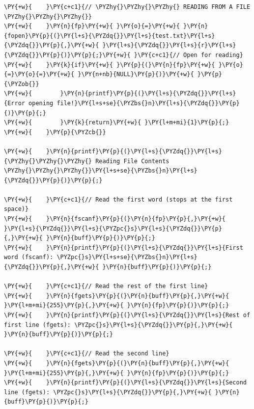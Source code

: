 \begin{Verbatim}[label=\makebox{\url{https://github.com/lucabaldini/cmepda/tree/master/slides/latex/snippets/file_io.c}},commandchars=\\\{\}]
\PY{+w}{    }\PY{c+c1}{// \PYZhy{}\PYZhy{}\PYZhy{} READING FROM A FILE \PYZhy{}\PYZhy{}\PYZhy{}}
\PY{+w}{    }\PY{n}{fp}\PY{+w}{ }\PY{o}{=}\PY{+w}{ }\PY{n}{fopen}\PY{p}{(}\PY{l+s}{\PYZdq{}}\PY{l+s}{test.txt}\PY{l+s}{\PYZdq{}}\PY{p}{,}\PY{+w}{ }\PY{l+s}{\PYZdq{}}\PY{l+s}{r}\PY{l+s}{\PYZdq{}}\PY{p}{)}\PY{p}{;}\PY{+w}{ }\PY{c+c1}{// Open for reading}
\PY{+w}{    }\PY{k}{if}\PY{+w}{ }\PY{p}{(}\PY{n}{fp}\PY{+w}{ }\PY{o}{=}\PY{o}{=}\PY{+w}{ }\PY{n+nb}{NULL}\PY{p}{)}\PY{+w}{ }\PY{p}{\PYZob{}}
\PY{+w}{        }\PY{n}{printf}\PY{p}{(}\PY{l+s}{\PYZdq{}}\PY{l+s}{Error opening file!}\PY{l+s+se}{\PYZbs{}n}\PY{l+s}{\PYZdq{}}\PY{p}{)}\PY{p}{;}
\PY{+w}{        }\PY{k}{return}\PY{+w}{ }\PY{l+m+mi}{1}\PY{p}{;}
\PY{+w}{    }\PY{p}{\PYZcb{}}

\PY{+w}{    }\PY{n}{printf}\PY{p}{(}\PY{l+s}{\PYZdq{}}\PY{l+s}{\PYZhy{}\PYZhy{}\PYZhy{} Reading File Contents \PYZhy{}\PYZhy{}\PYZhy{}}\PY{l+s+se}{\PYZbs{}n}\PY{l+s}{\PYZdq{}}\PY{p}{)}\PY{p}{;}

\PY{+w}{    }\PY{c+c1}{// Read the first word (stops at the first space)}
\PY{+w}{    }\PY{n}{fscanf}\PY{p}{(}\PY{n}{fp}\PY{p}{,}\PY{+w}{ }\PY{l+s}{\PYZdq{}}\PY{l+s}{\PYZpc{}s}\PY{l+s}{\PYZdq{}}\PY{p}{,}\PY{+w}{ }\PY{n}{buff}\PY{p}{)}\PY{p}{;}
\PY{+w}{    }\PY{n}{printf}\PY{p}{(}\PY{l+s}{\PYZdq{}}\PY{l+s}{First word (fscanf): \PYZpc{}s}\PY{l+s+se}{\PYZbs{}n}\PY{l+s}{\PYZdq{}}\PY{p}{,}\PY{+w}{ }\PY{n}{buff}\PY{p}{)}\PY{p}{;}

\PY{+w}{    }\PY{c+c1}{// Read the rest of the first line}
\PY{+w}{    }\PY{n}{fgets}\PY{p}{(}\PY{n}{buff}\PY{p}{,}\PY{+w}{ }\PY{l+m+mi}{255}\PY{p}{,}\PY{+w}{ }\PY{n}{fp}\PY{p}{)}\PY{p}{;}
\PY{+w}{    }\PY{n}{printf}\PY{p}{(}\PY{l+s}{\PYZdq{}}\PY{l+s}{Rest of first line (fgets): \PYZpc{}s}\PY{l+s}{\PYZdq{}}\PY{p}{,}\PY{+w}{ }\PY{n}{buff}\PY{p}{)}\PY{p}{;}

\PY{+w}{    }\PY{c+c1}{// Read the second line}
\PY{+w}{    }\PY{n}{fgets}\PY{p}{(}\PY{n}{buff}\PY{p}{,}\PY{+w}{ }\PY{l+m+mi}{255}\PY{p}{,}\PY{+w}{ }\PY{n}{fp}\PY{p}{)}\PY{p}{;}
\PY{+w}{    }\PY{n}{printf}\PY{p}{(}\PY{l+s}{\PYZdq{}}\PY{l+s}{Second line (fgets): \PYZpc{}s}\PY{l+s}{\PYZdq{}}\PY{p}{,}\PY{+w}{ }\PY{n}{buff}\PY{p}{)}\PY{p}{;}


\end{Verbatim}
